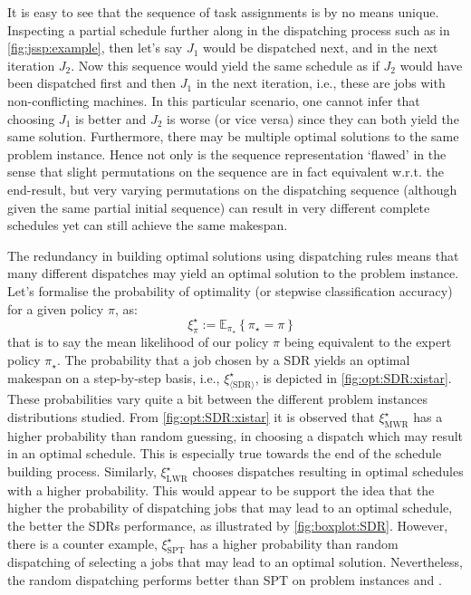 \documentclass[twocolumn]{svjour3}
\begin{document}
It is easy to see that the sequence of task assignments is by no means unique. 
Inspecting a partial schedule further along in the dispatching process such as 
in \cref{fig:jssp:example}, then let's say $J_1$ would be dispatched next, and 
in the next iteration $J_2$. Now this sequence would yield the same schedule as 
if $J_2$ would have been dispatched first and then $J_1$ in the next iteration, 
i.e., these are jobs with non-conflicting machines. 
In this particular scenario, one cannot infer that choosing $J_1$ is better 
and $J_2$ is worse (or vice versa) since they can both yield the same solution.
Furthermore, 
there may be multiple optimal solutions to the same 
problem instance. Hence not only is the sequence representation `flawed' in the 
sense that slight permutations on the sequence are in fact equivalent w.r.t. 
the end-result, but very varying permutations on the dispatching sequence 
(although given the same partial initial sequence) can result in very different 
complete schedules yet can still achieve the same makespan. 

The redundancy in building optimal solutions using dispatching rules means that 
many different dispatches may yield an optimal solution to the problem instance.
Let's formalise the probability of optimality (or stepwise 
classification accuracy) for a given policy $\pi$, as:
\begin{equation}\quad \label{eq:tracc:opt}
\xi^\star_{\pi} := \mathbb{E}_{\pi_\star}\left\{\pi_{\star} = \pi \right\}
\end{equation}
that is to say the mean likelihood of our policy $\pi$ being equivalent to the 
expert policy $\pi_\star$.
The probability that a job chosen by a SDR yields an optimal makespan on a 
step-by-step basis, i.e., $\xi^\star_{\langle \text{SDR} \rangle}$, is depicted 
in \cref{fig:opt:SDR:xistar}. These probabilities
vary quite a bit between the different problem instances distributions studied. 
From \cref{fig:opt:SDR:xistar} it is observed that $\xi^\star_{\text{MWR}}$ has 
a higher probability than random guessing, in choosing a dispatch which may 
result in an optimal schedule. This is especially true towards the end of the 
schedule building process. 
Similarly, $\xi^\star_{\text{LWR}}$ chooses dispatches 
resulting in optimal schedules with a higher probability. This would appear to 
be support the idea that the higher the probability of dispatching jobs that 
may lead to an optimal schedule, the better the SDRs performance, as 
illustrated by \cref{fig:boxplot:SDR}. However, there is a counter example, 
$\xi^\star_{\text{SPT}}$ has a higher probability than random dispatching of 
selecting a jobs that may lead to an optimal solution. Nevertheless, the random 
dispatching performs better than SPT on problem instances  and 
. 
\end{document}
